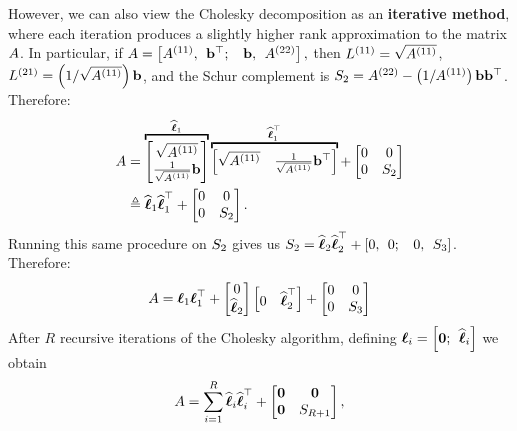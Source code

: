 However, we can also view the Cholesky decomposition as an {\bf iterative method}, where each iteration produces a slightly higher rank approximation to the matrix $A$.
In particular, if  $ A = \left[ A^{(11)}, \:\: \mathbf{b}^{\top}; \:\:\:\: \mathbf{b}, \:\: A^{(22)} \right], $
then $L^{(11)} = \sqrt{A^{(11)}}$, $L^{(21)} = \left( 1 / \sqrt{A^{(11)}} \right) \mathbf{b}$, and the Schur complement is $S_2 = A^{(22)} - \left(1/ A^{(11)} \right) \mathbf{b} \mathbf{b}^{\top}$.
Therefore:
%
\begin{align}
  \bA &=
    \overbracket{\begin{bmatrix} \sqrt{ A^{(11)} } \\ \frac{1}{\sqrt{A^{(11)}}} \bb \end{bmatrix}}^{\widehat \bl_1}
    \overbracket{\begin{bmatrix} \sqrt{ A^{(11)} } & \frac{1}{\sqrt{A^{(11)}}} \bb^\top \end{bmatrix}}^{\widehat \bl_1^\top}
    +
    \begin{bmatrix} 0 & 0 \\ 0 & \bS_2 \end{bmatrix}
  \nonumber \\
  &\triangleq \widehat \bl_{1} \widehat \bl_{1}^{\top} + \begin{bmatrix} 0 & 0 \\ 0 & \bS_2 \end{bmatrix}
  \label{eqn:chol_incomplete}.
\end{align}
%
Running this same procedure on $S_2$ gives us $S_2 = \widehat {\boldsymbol{\ell}}_{2} \widehat {\boldsymbol{\ell}}_{2}^{\top} + \left[0, \:\: 0; \:\:\:\: 0, \:\: S_3 \right]$.
Therefore:
%
\begin{align*}
  A  = \boldsymbol{\ell}_{1}\boldsymbol{\ell}_{1}^{\top} + \begin{bmatrix} 0 \\ \widehat {\boldsymbol{\ell}}_{2} \end{bmatrix} \begin{bmatrix} 0 & \widehat {\boldsymbol{\ell}}_2^\top \end{bmatrix} +
  \begin{bmatrix} 0 & 0 \\ 0 & S_3 \end{bmatrix}
\end{align*}
%
After $R$ recursive iterations of the Cholesky algorithm, defining $\boldsymbol{\ell}_{i} = \left[ \mathbf{0}; \:\: \widehat {\boldsymbol{\ell}}_i \right]$ we obtain
%
\begin{align}
  A  = \sum_{i=1}^{R} \widehat {\boldsymbol{\ell}}_{i} \widehat {\boldsymbol{\ell}}_{i}^{\top} + \begin{bmatrix} \mathbf{0} & \mathbf{0} \\ \mathbf{0} & S_{R+1} \end{bmatrix},
  \label{eqn:chol_low_rank}
\end{align}
